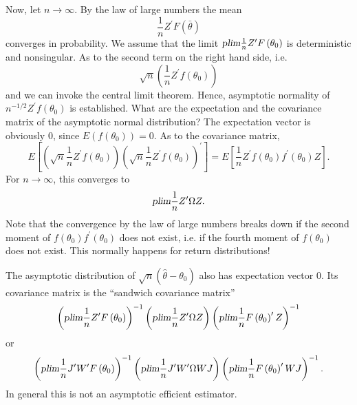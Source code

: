 \documentclass{article}
\begin{document}
Now, let $n\rightarrow \infty $. By the law of large numbers the mean%
\begin{equation*}
\frac{1}{n}Z^{\prime }F\left( \bar{\theta}\right)
\end{equation*}%
converges in probability. We assume that the limit $\textsl{plim}\frac{1}{n}Z^{\prime }F\left( \theta _{0}\right) $ is deterministic and nonsingular. As
to the second term on the right hand side, i.e.%
\begin{equation*}
\sqrt{n}\left( \frac{1}{n}Z^{\prime }f\left( \theta _{0}\right) \right)
\end{equation*}%
and we can invoke the central limit theorem. Hence, asymptotic normality of $%
n^{-1/2}Z^{\prime }f\left( \theta _{0}\right) $ is established. What are the
expectation and the covariance matrix of the asymptotic normal distribution?
The expectation vector is obviously 0, since $E(f(\theta _{0}))=0$. As to
the covariance matrix,%
\begin{equation*}
E\left[ \left( \sqrt{n}\frac{1}{n}Z^{\prime }f\left( \theta _{0}\right)
\right) \left( \sqrt{n}\frac{1}{n}Z^{\prime }f\left( \theta _{0}\right)
\right) ^{\prime }\right] =E\left[ \frac{1}{n}Z^{\prime }f\left( \theta
_{0}\right) f^{\prime }(\theta _{0})Z\right] .
\end{equation*}%
For $n\rightarrow \infty $, this converges to%
\begin{equation*}
\textsl{plim}\frac{1}{n}Z^{\prime }\Omega Z.
\end{equation*}%
Note that the convergence by the law of large numbers breaks down if the
second moment of $f\left( \theta _{0}\right) f^{\prime }(\theta _{0})$ does
not exist, i.e. if the fourth moment of $f(\theta _{0})$ does not exist.
This normally happens for return distributions!

The asymptotic distribution of $\sqrt{n}\left( \hat{\theta}-\theta
_{0}\right) $ also has expectation vector 0. Its covariance matrix is the
\textquotedblleft sandwich covariance matrix\textquotedblright
\begin{equation*}
\left( \textsl{plim}\frac{1}{n}Z^{\prime }F\left( \theta _{0}\right)
\right) ^{-1}\left( \textsl{plim}\frac{1}{n}Z^{\prime }\Omega Z\right)
\left( \textsl{plim}\frac{1}{n}F\left( \theta _{0}\right) ^{\prime
}Z\right) ^{-1}
\end{equation*}%
or%
\begin{equation*}
\left( \textsl{plim}\frac{1}{n}J^{\prime }W^{\prime }F\left( \theta
_{0}\right) \right) ^{-1}\left( \textsl{plim}\frac{1}{n}J^{\prime
}W^{\prime }\Omega WJ\right) \left( \textsl{plim}\frac{1}{n}F\left( \theta
_{0}\right) ^{\prime }WJ\right) ^{-1}.
\end{equation*}
In general this is not an asymptotic efficient estimator.
\end{document}
